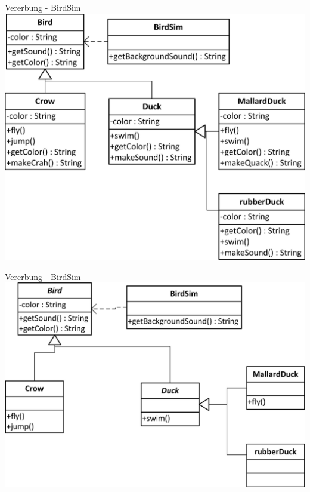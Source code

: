\documentclass[18pt]{beamer}
\begin{document}

\begin{frame}{Vererbung - BirdSim}
	\includegraphics[scale=1]{bilder/uml/uml3.jpg}
\end{frame}


\begin{frame}{Vererbung - BirdSim}
	\includegraphics[scale=1]{bilder/uml/uml4.jpg}
\end{frame}

\end{document}
